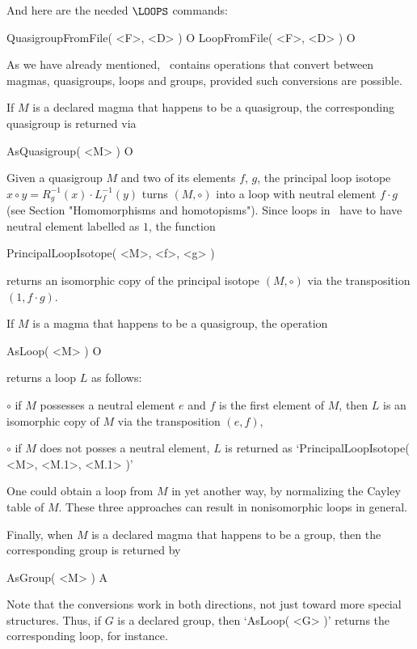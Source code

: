 \medskip

And here are the needed ${\LOOPS}$ commands:

\>QuasigroupFromFile( <F>, <D> ) O
\>LoopFromFile( <F>, <D> ) O


As we have already mentioned, \LOOPS\ contains operations that convert
between magmas, quasigroups, loops and groups, provided such conversions are
possible.

If $M$ is a declared magma that happens to be a quasigroup, the corresponding
quasigroup is returned via

\>AsQuasigroup( <M> ) O

Given a quasigroup $M$ and two of its elements $f$, $g$, the principal loop
isotope $x\circ y = R_g^{-1}(x)\cdot L_f^{-1}(y)$ turns $(M,\circ)$ into a loop
with neutral element $f\cdot g$ (see Section "Homomorphisms and homotopisms").
Since loops in \LOOPS\ have to have neutral element labelled as $1$, the
function

\>PrincipalLoopIsotope( <M>, <f>, <g> )

returns an isomorphic copy of the principal isotope $(M,\circ)$ via the
transposition $(1,f\cdot g)$.

If $M$ is a magma that happens to be a quasigroup, the operation

\>AsLoop( <M> ) O

returns a loop $L$ as follows:
\beginlist%
\item{$\circ$}
    if $M$ possesses a neutral element $e$ and $f$ is the first element of $M$,
    then $L$ is an isomorphic copy of $M$ via the transposition $(e,f)$,
\item{$\circ$}
    if $M$ does not posses a neutral element, $L$ is returned as
    `PrincipalLoopIsotope( <M>, <M.1>, <M.1> )'
\endlist

One could obtain a loop from $M$ in yet another way, by normalizing the Cayley
table of $M$. These three approaches can result in nonisomorphic loops in
general.

Finally, when $M$ is a declared magma that happens to be a group, then the
corresponding group is returned by

\>AsGroup( <M> ) A

Note that the conversions work in both directions, not just toward more special
structures. Thus, if $G$ is a declared group, then `AsLoop( <G> )' returns the
corresponding loop, for instance.

